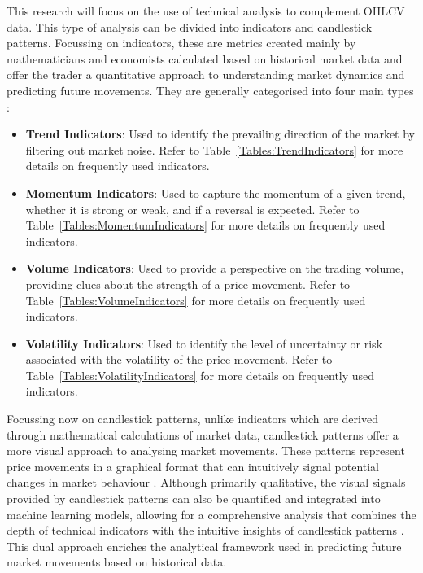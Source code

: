 This research will focus on the use of technical analysis to complement OHLCV data. This type of analysis can be divided into indicators and candlestick patterns. Focussing on indicators, these are metrics created mainly by mathematicians and economists calculated based on historical market data and offer the trader a quantitative approach to understanding market dynamics and predicting future movements. They are generally categorised into four main types \cite{lim_handbook_2015}:

\begin{itemize}
\item \textbf{Trend Indicators}: Used to identify the prevailing direction of the market by filtering out market noise. Refer to Table~\ref{Tables:TrendIndicators} for more details on frequently used indicators.
\item \textbf{Momentum Indicators}: Used to capture the momentum of a given trend, whether it is strong or weak, and if a reversal is expected. Refer to Table~\ref{Tables:MomentumIndicators} for more details on frequently used indicators.
\item \textbf{Volume Indicators}: Used to provide a perspective on the trading volume, providing clues about the strength of a price movement. Refer to Table~\ref{Tables:VolumeIndicators} for more details on frequently used indicators.
\item \textbf{Volatility Indicators}: Used to identify the level of uncertainty or risk associated with the volatility of the price movement. Refer to Table~\ref{Tables:VolatilityIndicators} for more details on frequently used indicators.
\end{itemize}






Focussing now on candlestick patterns, unlike indicators which are derived through mathematical calculations of market data, candlestick patterns offer a more visual approach to analysing market movements. These patterns represent price movements in a graphical format that can intuitively signal potential changes in market behaviour \cite{rhoads_candlestick_2022}. Although primarily qualitative, the visual signals provided by candlestick patterns can also be quantified and integrated into machine learning models, allowing for a comprehensive analysis that combines the depth of technical indicators with the intuitive insights of candlestick patterns \cite{jansen_machine_2020}. This dual approach enriches the analytical framework used in predicting future market movements based on historical data.

